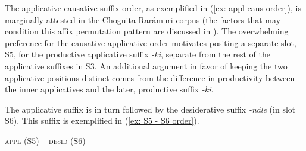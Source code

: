     \z
\z

The applicative-causative suffix order, as exemplified in (\ref{ex: appl-caus order}), is marginally attested in the Choguita Rarámuri corpus (the factors that may condition this affix permutation pattern are discussed in \citealt{caballero2010scope}). The overwhelming preference for the causative-applicative order motivates positing a separate slot, S5, for the productive applicative suffix \textit{-ki}, separate from the rest of the applicative suffixes in S3. An additional argument in favor of keeping the two applicative positions distinct comes from the difference in productivity between the inner applicatives and the later, productive suffix \textit{-ki}.

The applicative suffix is in turn followed by the desiderative suffix \textit{-nále} (in slot S6). This suffix is exemplified in (\ref{ex: S5 - S6 order}).

\ea\label{ex: S5 - S6 order}
{\textsc{appl} (S5) -- \textsc{desid} (S6)}

